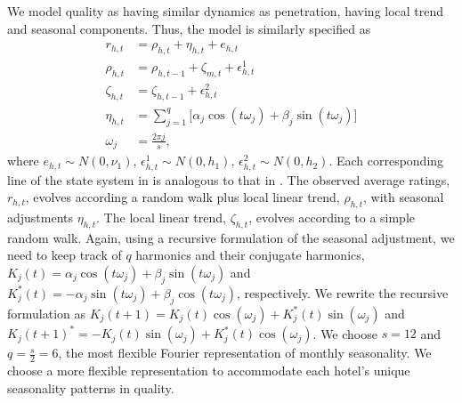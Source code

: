 \documentclass[mksc,blindrev]{informs3} %
\begin{document}
We model quality as having similar dynamics as penetration, having local trend and seasonal components. Thus, the model is similarly specified as 
\begin{equation}\label{eq:ratings_dlm}
\begin{split}
r_{h,t}&=\rho_{h,t}+\eta_{h,t}+e_{h,t}\\
\rho_{h,t}&=\rho_{h,t-1}+\zeta_{m,t}+\epsilon_{h,t}^{1} \\
\zeta_{h,t} &= \zeta_{h,t-1} +\epsilon_{h,t}^{2} \\
\eta_{h,t} &=\sum_{j=1}^{q}\big[\alpha_j\cos(t\omega_j)+\beta_j\sin(t\omega_j)\big] \\
\omega_j &= \frac{2\pi j}{s},
\end{split}
\end{equation}
where $e_{h,t}\sim N(0,\nu_1)\text{, }\epsilon_{h,t}^{1}\sim N(0,h_1)\text{, }\epsilon_{h,t}^{2}\sim N(0,h_2)$. Each corresponding line of the state system in  is analogous to that in . The observed average ratings, $r_{h,t}$, evolves according a random walk plus local linear trend, $\rho_{h,t}$, with seasonal adjustments $\eta_{h,t}$. The local linear trend, $\zeta_{h,t}$, evolves according to a simple random walk. Again, using a recursive formulation of the seasonal adjustment, we need to keep track of $q$ harmonics and their conjugate harmonics, $K_j(t)=\alpha_j\cos(t\omega_j)+\beta_j\sin(t\omega_j)$ and $K_j^{*}(t)=-\alpha_j\sin(t\omega_j)+\beta_j\cos(t\omega_j)$, respectively. We rewrite the recursive formulation as $K_j(t+1)=K_j(t)\cos(\omega_j)+K_j^{*}(t)\sin(\omega_j)$ and $K_j(t+1)^{*}=-K_j(t)\sin(\omega_j)+K_j^{*}(t)\cos(\omega_j)$. We choose $s=12$ and $q=\frac{s}{2}=6$, the most flexible Fourier representation of monthly seasonality. We choose a more flexible representation to accommodate each hotel's unique seasonality patterns in quality. %
\end{document}
